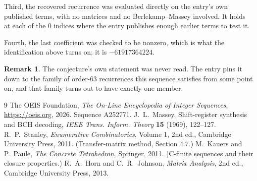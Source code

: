 \documentclass[11pt,a4paper]{article}
\theoremstyle{plain}
\theoremstyle{definition}
\newtheorem{remark}[theorem]{Remark}
\begin{document}
Third, the recovered recurrence was evaluated directly on the entry's own published terms, with
no matrices and no Berlekamp--Massey involved. It holds at each of the $0$ indices where
the entry publishes enough earlier terms to test it.

Fourth, the last coefficient was checked to be nonzero, which is what the identification above
turns on; it is $-61917364224$.

\begin{remark}
The conjecture's own statement was never read. The entry pins it down to the family of
order-$63$ recurrences this sequence satisfies from some point on, and that family turns
out to have exactly one member.
\end{remark}

\begin{thebibliography}{9}
 The OEIS Foundation, \emph{The On-Line Encyclopedia of Integer
Sequences}, \url{https://oeis.org}, 2026. Sequence A252771.
 J.~L.~Massey, Shift-register synthesis and BCH decoding, \emph{IEEE
Trans. Inform. Theory} \textbf{15} (1969), 122--127.
 R.~P.~Stanley, \emph{Enumerative Combinatorics}, Volume 1, 2nd ed.,
Cambridge University Press, 2011. (Transfer-matrix method, Section 4.7.)
 M.~Kauers and P.~Paule, \emph{The Concrete Tetrahedron}, Springer, 2011.
(C-finite sequences and their closure properties.)
 R.~A.~Horn and C.~R.~Johnson, \emph{Matrix Analysis}, 2nd ed., Cambridge
University Press, 2013.
\end{thebibliography}
\end{document}

